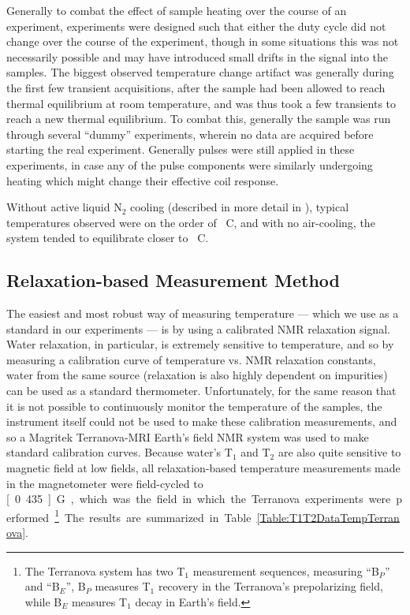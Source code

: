 \documentclass[PaulGanssle-Thesis.tex]{subfiles}
\begin{document}
Generally to combat the effect of sample heating over the course of an experiment, experiments were designed such that either the duty cycle did not change over the course of the experiment, though in some situations this was not necessarily possible and may have introduced small drifts in the signal into the samples. The biggest observed temperature change artifact was generally during the first few transient acquisitions, after the sample had been allowed to reach thermal equilibrium at room temperature, and was thus took a few transients to reach a new thermal equilibrium. To combat this, generally the sample was run through several ``dummy'' experiments, wherein no data are acquired before starting the real experiment. Generally pulses were still applied in these experiments, in case any of the pulse components were similarly undergoing heating which might change their effective coil response.

Without active liquid N$_{\mathrm{2}}$ cooling (described in more detail in ), typical temperatures observed were on the order of \unit[35-37]{\degsym C}, and with no air-cooling, the system tended to equilibrate closer to \unit[60]{\degsym C}.

\subsection{Relaxation-based Measurement Method}
\label{nmr.sampletemp.relaxation}
The easiest and most robust way of measuring temperature --- which we use as a standard in our experiments --- is by using a calibrated NMR relaxation signal. Water relaxation, in particular, is extremely sensitive to temperature, and so by measuring a calibration curve of temperature vs. NMR relaxation constants, water from the same source (relaxation is also highly dependent on impurities) can be used as a standard thermometer. Unfortunately, for the same reason that it is not possible to continuously monitor the temperature of the samples, the instrument itself could not be used to make these calibration measurements, and so a Magritek Terranova-MRI Earth's field NMR system was used to make standard calibration curves. Because water's $\mathrm{T}_{1}$ and $\mathrm{T}_{2}$ are also quite sensitive to magnetic field at low fields, all relaxation-based temperature measurements made in the magnetometer were field-cycled to \unit[0.435]{G}, which was the field in which the Terranova experiments were performed.\footnote{The Terranova system has two T$_1$ measurement sequences, measuring ``B$_P$'' and ``B$_E$'', B$_P$ measures T$_1$ recovery in the Terranova's prepolarizing field, while B$_E$ measures T$_1$ decay in Earth's field.} The results are summarized in Table \ref{Table:T1T2DataTempTerranova}.
\end{document}
